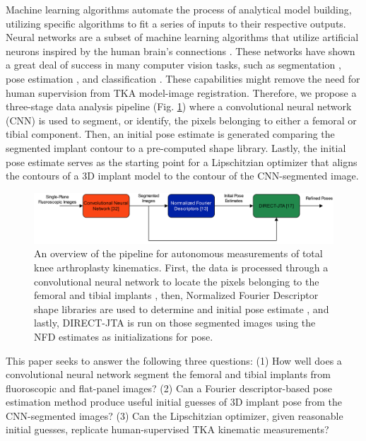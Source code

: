 Machine learning algorithms automate the process of analytical model building, utilizing specific algorithms to fit a series of inputs to their respective outputs. Neural networks are a subset of machine learning algorithms that utilize artificial neurons inspired by the human brain’s connections \cite{marrEarlyProcessingVisual1976}. These networks have shown a great deal of success in many computer vision tasks, such as segmentation \cite{chanHistoSegNetSemanticSegmentation2019,wangDeepHighResolutionRepresentation2020,ronnebergerUNetConvolutionalNetworks2015}, pose estimation \cite{wuDeepGraphPose2020,kendallGeometricLossFunctions2017}, and classification \cite{krizhevskyImageNetClassificationDeep2017,qiPointNetDeepHierarchical2017,qiPointNetDeepLearning2017}. These capabilities might remove the need for human supervision from TKA model-image registration. Therefore, we propose a three-stage data analysis pipeline (Fig. \ref{fig:pipeline}) where a convolutional neural network (CNN) is used to segment, or identify, the pixels belonging to either a femoral or tibial component. Then, an initial pose estimate is generated comparing the segmented implant contour to a pre-computed shape library. Lastly, the initial pose estimate serves as the starting point for a Lipschitzian optimizer that aligns the contours of a 3D implant model to the contour of the CNN-segmented image.

\begin{figure}[ht]
    \centering
    \includegraphics[width = \textwidth]{figs/jtml-paper/fig1-flowchart.png}
    \caption{An overview of the pipeline for autonomous measurements of total knee arthroplasty kinematics. First, the data is processed through a convolutional neural network to locate the pixels belonging to the femoral and tibial implants \cite{wangDeepHighResolutionRepresentation2020}, then, Normalized Fourier Descriptor shape libraries are used to determine and initial pose estimate \cite{banksAccurateMeasurementThreedimensional1996}, and lastly, DIRECT-JTA \cite{floodAutomatedRegistration3D2018} is run on those segmented images using the NFD estimates as initializations for pose.}
    \label{fig:pipeline}
\end{figure}

This paper seeks to answer the following three questions: (1) How well does a convolutional neural network segment the femoral and tibial implants from fluoroscopic and flat-panel images? (2) Can a Fourier descriptor-based pose estimation method produce useful initial guesses of 3D implant pose from the CNN-segmented images? (3) Can the Lipschitzian optimizer, given reasonable initial guesses, replicate human-supervised TKA kinematic measurements? 


